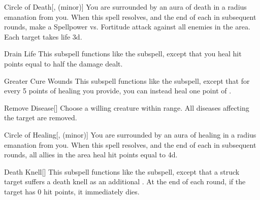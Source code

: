 \begin{ability}[\nth{3}]{Circle of Death}[,  (minor)]
You are surrounded by an aura of death in a \areamed radius emanation from you.
When this spell resolves, and the end of each  in subsequent rounds, make a Spellpower vs. Fortitude attack against all enemies in the area.
\hit Each target takes life  \minus3d.
\end{ability}
\vspace{0.25em}


\begin{ability}[\nth{3}]{Drain Life}
This subspell functions like the  subspell, except that you heal hit points equal to half the damage dealt.
\end{ability}
\vspace{0.25em}


\begin{ability}[\nth{3}]{Greater Cure Wounds}
This subspell functions like the  subspell, except that for every 5 points of healing you provide, you can instead heal one point of .
\end{ability}
\vspace{0.25em}


\begin{ability}[\nth{3}]{Remove Disease}[]
Choose a willing creature within \rngclose range.
All diseases affecting the target are removed.
\end{ability}
\vspace{0.25em}


\begin{ability}[\nth{4}]{Circle of Healing}[,  (minor)]
You are surrounded by an aura of healing in a \areamed radius emanation from you.
When this spell resolves, and the end of each  in subsequent rounds, all allies in the area heal hit points equal to  \minus4d.
\end{ability}
\vspace{0.25em}


\begin{ability}[\nth{4}]{Death Knell}[]
This subspell functions like the  subspell, except that a struck target suffers a death knell as an additional .
At the end of each round, if the target has 0 hit points, it immediately dies.
\end{ability}
\vspace{0.25em}


